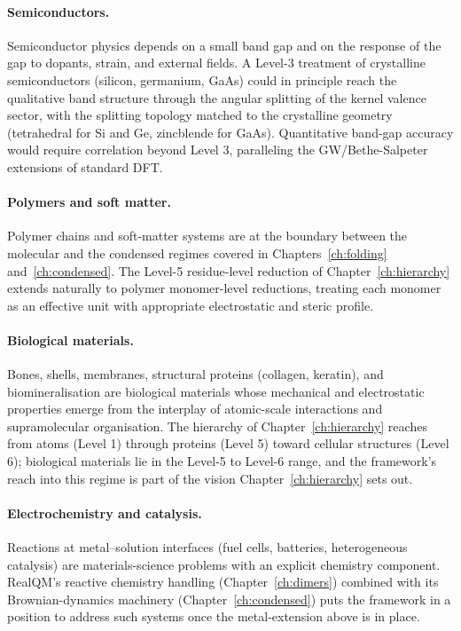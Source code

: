 \paragraph{Semiconductors.}
Semiconductor physics depends on a small band gap and on the response of the gap to dopants, strain, and external fields. A Level-3 treatment of crystalline semiconductors (silicon, germanium, GaAs) could in principle reach the qualitative band structure through the angular splitting of the kernel valence sector, with the splitting topology matched to the crystalline geometry (tetrahedral for Si and Ge, zincblende for GaAs). Quantitative band-gap accuracy would require correlation beyond Level 3, paralleling the GW/Bethe-Salpeter extensions of standard DFT.

\paragraph{Polymers and soft matter.}
Polymer chains and soft-matter systems are at the boundary between the molecular and the condensed regimes covered in Chapters~\ref{ch:folding} and~\ref{ch:condensed}. The Level-5 residue-level reduction of Chapter~\ref{ch:hierarchy} extends naturally to polymer monomer-level reductions, treating each monomer as an effective unit with appropriate electrostatic and steric profile.

\paragraph{Biological materials.}
Bones, shells, membranes, structural proteins (collagen, keratin), and biomineralisation are biological materials whose mechanical and electrostatic properties emerge from the interplay of atomic-scale interactions and supramolecular organisation. The hierarchy of Chapter~\ref{ch:hierarchy} reaches from atoms (Level 1) through proteins (Level 5) toward cellular structures (Level 6); biological materials lie in the Level-5 to Level-6 range, and the framework's reach into this regime is part of the vision Chapter~\ref{ch:hierarchy} sets out.

\paragraph{Electrochemistry and catalysis.}
Reactions at metal--solution interfaces (fuel cells, batteries, heterogeneous catalysis) are materials-science problems with an explicit chemistry component. RealQM's reactive chemistry handling (Chapter~\ref{ch:dimers}) combined with its Brownian-dynamics machinery (Chapter~\ref{ch:condensed}) puts the framework in a position to address such systems once the metal-extension above is in place.

